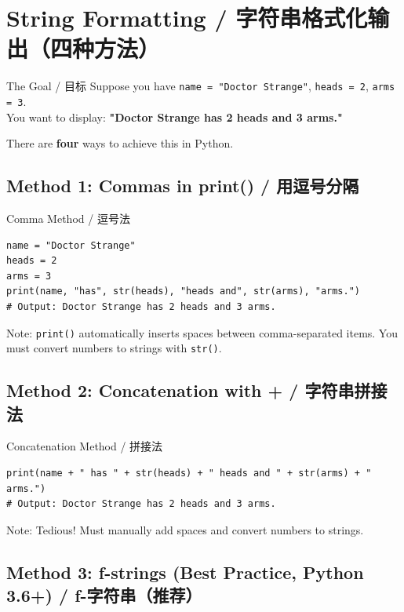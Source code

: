 \documentclass[11pt,a4paper]{article}
\begin{document}
\section{String Formatting / 字符串格式化输出（四种方法）}

\begin{concept}{The Goal / 目标}
    Suppose you have \texttt{name = "Doctor Strange"}, \texttt{heads = 2}, \texttt{arms = 3}. \\
    You want to display: \textbf{"Doctor Strange has 2 heads and 3 arms."}

    There are \textbf{four} ways to achieve this in Python.
\end{concept}

\subsection{Method 1: Commas in print() / 用逗号分隔}

\begin{examplebox}{Comma Method / 逗号法}
\begin{lstlisting}
name = "Doctor Strange"
heads = 2
arms = 3
print(name, "has", str(heads), "heads and", str(arms), "arms.")
# Output: Doctor Strange has 2 heads and 3 arms.
\end{lstlisting}
    Note: \texttt{print()} automatically inserts spaces between comma-separated items. You must convert numbers to strings with \texttt{str()}.
\end{examplebox}

\subsection{Method 2: Concatenation with + / 字符串拼接法}

\begin{examplebox}{Concatenation Method / 拼接法}
\begin{lstlisting}
print(name + " has " + str(heads) + " heads and " + str(arms) + " arms.")
# Output: Doctor Strange has 2 heads and 3 arms.
\end{lstlisting}
    Note: Tedious! Must manually add spaces and convert numbers to strings.
\end{examplebox}

\subsection{Method 3: f-strings (Best Practice, Python 3.6+) / f-字符串（推荐）}
\end{document}
